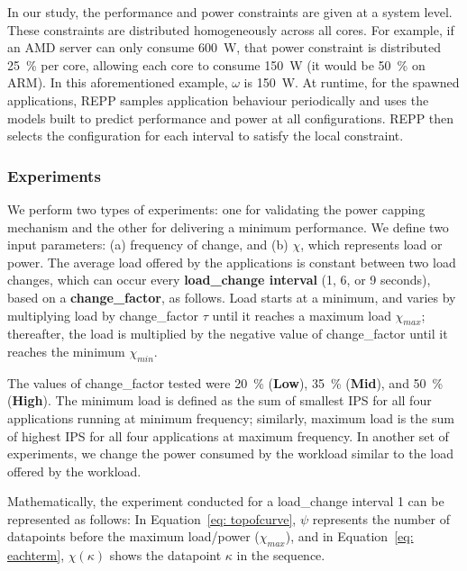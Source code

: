 In our study, the performance and power constraints are given at a system level. These
constraints are  distributed  homogeneously across all cores. For example, if an AMD
server can only consume \SI{600}{\watt}, that power constraint is distributed
\SI{25}{\percent} per core, allowing each core to consume \SI{150}{\watt} (it would be
\SI{50}{\percent} on ARM). In this aforementioned example, $\omega$ is \SI{150}{\watt}.
At runtime, for the spawned applications, REPP samples application behaviour
periodically and uses the models built to predict performance and power at all
configurations. REPP then selects the configuration for each interval to satisfy the
local constraint.


\subsubsection{Experiments}
\label{subsubsec: experiments repph}

We perform two types of experiments: one for validating the power capping mechanism and
the other for delivering a minimum performance. We define two input parameters: (a)
frequency of change, and (b) $\chi$, which represents load or power.  The average load
offered by the applications is constant between two load changes, which can occur every
\textbf{load\_change interval} (1, 6, or 9 seconds), based on a \textbf{change\_factor},
as follows.  Load starts at a minimum, and varies by multiplying load by change\_factor
$\tau$ until it reaches a maximum load $\chi_{\mathit{max}}$; thereafter, the load is
multiplied by the negative value of change\_factor until it reaches the minimum
$\chi_{\mathit{min}}$.

 The values of change\_factor tested were \SI{20}{\percent} (\textbf{Low}),
\SI{35}{\percent} (\textbf{Mid}), and \SI{50}{\percent} (\textbf{High}). The minimum load
is defined as the sum of smallest IPS for all four applications running at minimum
frequency; similarly, maximum load is the sum of highest IPS for all four applications at
maximum frequency. In another set of experiments, we change the power consumed by the
workload similar to the load offered by the workload. 

 Mathematically, the experiment conducted for a load\_change interval 1 can
be represented as follows: In Equation~\ref{eq: topofcurve}, $\psi$ represents the number
of datapoints before the maximum load/power ($\chi_{\mathit{max}}$), and in
Equation~\ref{eq: eachterm}, $\chi(\kappa)$ shows the datapoint $\kappa$ in the sequence.

